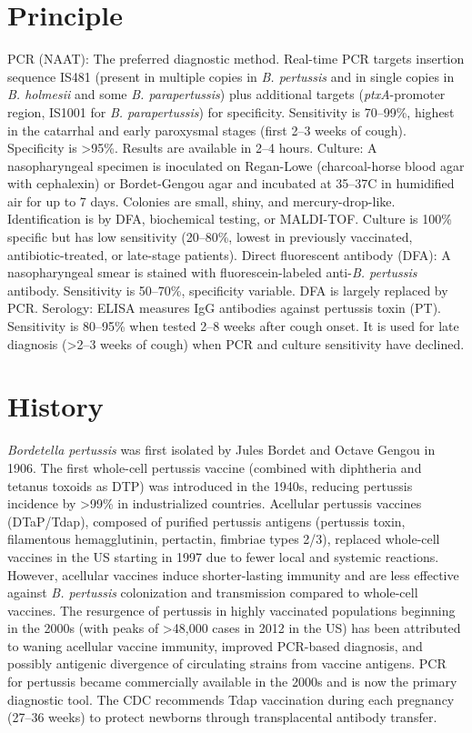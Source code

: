 \section*{Principle}
PCR (NAAT): The preferred diagnostic method. Real-time PCR targets insertion sequence IS481 (present in multiple copies in \textit{B. pertussis} and in single copies in \textit{B. holmesii} and some \textit{B. parapertussis}) plus additional targets (\textit{ptxA}-promoter region, IS1001 for \textit{B. parapertussis}) for specificity. Sensitivity is 70--99\%, highest in the catarrhal and early paroxysmal stages (first 2--3 weeks of cough). Specificity is >95\%. Results are available in 2--4 hours. Culture: A nasopharyngeal specimen is inoculated on Regan-Lowe (charcoal-horse blood agar with cephalexin) or Bordet-Gengou agar and incubated at 35--37\textdegree{}C in humidified air for up to 7 days. Colonies are small, shiny, and mercury-drop-like. Identification is by DFA, biochemical testing, or MALDI-TOF. Culture is 100\% specific but has low sensitivity (20--80\%, lowest in previously vaccinated, antibiotic-treated, or late-stage patients). Direct fluorescent antibody (DFA): A nasopharyngeal smear is stained with fluorescein-labeled anti-\textit{B. pertussis} antibody. Sensitivity is 50--70\%, specificity variable. DFA is largely replaced by PCR. Serology: ELISA measures IgG antibodies against pertussis toxin (PT). Sensitivity is 80--95\% when tested 2--8 weeks after cough onset. It is used for late diagnosis (>2--3 weeks of cough) when PCR and culture sensitivity have declined.

\section*{History}
\textit{Bordetella pertussis} was first isolated by Jules Bordet and Octave Gengou in 1906. The first whole-cell pertussis vaccine (combined with diphtheria and tetanus toxoids as DTP) was introduced in the 1940s, reducing pertussis incidence by >99\% in industrialized countries. Acellular pertussis vaccines (DTaP/Tdap), composed of purified pertussis antigens (pertussis toxin, filamentous hemagglutinin, pertactin, fimbriae types 2/3), replaced whole-cell vaccines in the US starting in 1997 due to fewer local and systemic reactions. However, acellular vaccines induce shorter-lasting immunity and are less effective against \textit{B. pertussis} colonization and transmission compared to whole-cell vaccines. The resurgence of pertussis in highly vaccinated populations beginning in the 2000s (with peaks of >48,000 cases in 2012 in the US) has been attributed to waning acellular vaccine immunity, improved PCR-based diagnosis, and possibly antigenic divergence of circulating strains from vaccine antigens. PCR for pertussis became commercially available in the 2000s and is now the primary diagnostic tool. The CDC recommends Tdap vaccination during each pregnancy (27--36 weeks) to protect newborns through transplacental antibody transfer.


